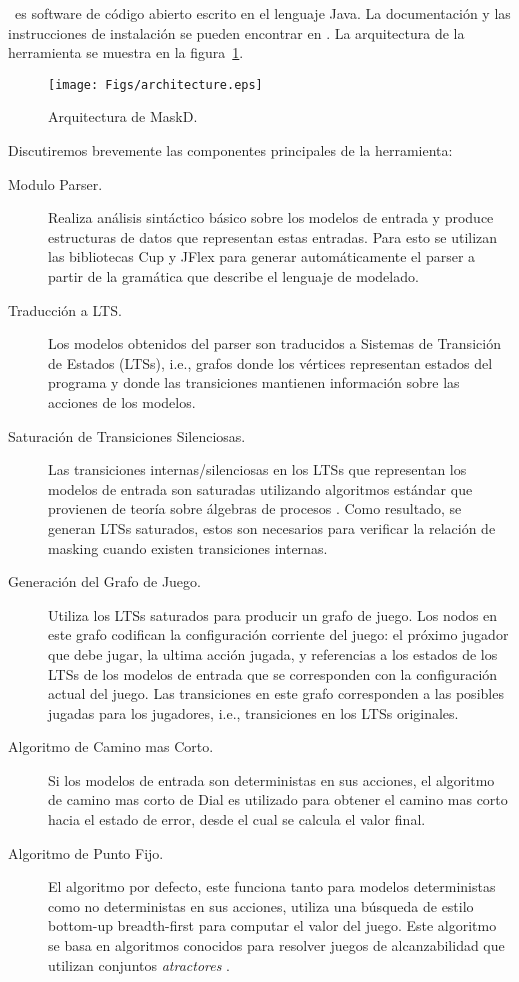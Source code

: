 \MaskD~es software de código abierto escrito en el lenguaje \textsf{Java}. La documentación y las instrucciones de instalación se pueden encontrar en \cite{MaskD}. La arquitectura de la herramienta se muestra en la figura~\ref{fig:arch}.
\begin{figure}[t]
    \centering
    \texttt{[image: Figs/architecture.eps]}
    \caption{Arquitectura de \textsf{MaskD}.}\label{fig:arch}
\end{figure}
    Discutiremos brevemente las componentes principales de la herramienta:
\begin{description}
    \item[Modulo Parser.] Realiza análisis sintáctico básico sobre los modelos de entrada y produce estructuras de datos que representan estas entradas. Para esto se utilizan las bibliotecas \textsf{Cup} y 
    \textsf{JFlex} para generar automáticamente el parser a partir de la gramática que describe el lenguaje de modelado.
    \item[Traducción a LTS.] Los modelos obtenidos del parser son traducidos a Sistemas de Transición de Estados (LTSs), i.e., 
    grafos donde los vértices representan estados del programa y donde las transiciones mantienen información sobre las acciones de los modelos. 
    \item[Saturación de Transiciones Silenciosas.] Las transiciones internas/silenciosas en los LTSs que representan los modelos de entrada son saturadas utilizando algoritmos estándar que provienen de teoría sobre álgebras de procesos \cite{Milner89}. Como resultado, se generan LTSs saturados, estos son necesarios para verificar la relación de masking cuando existen transiciones internas.
    \item[Generación del Grafo de Juego.] Utiliza los LTSs saturados para producir un grafo de juego. Los nodos en este grafo codifican la configuración corriente del juego: 
    el próximo jugador que debe jugar, la ultima acción jugada, y referencias a los estados de los LTSs de los modelos de entrada que se corresponden con la configuración actual del juego. 
    Las transiciones en este grafo corresponden a las posibles jugadas para los jugadores, i.e.,  transiciones en los LTSs originales.
    \item[Algoritmo de Camino mas Corto.] Si los modelos de entrada son deterministas en sus acciones, el algoritmo de camino mas corto de Dial es utilizado para obtener el camino mas corto hacia el estado de error, desde el cual se calcula el valor final.
    \item[Algoritmo de Punto Fijo.] El algoritmo por defecto, este funciona tanto para modelos deterministas como no deterministas en sus acciones, utiliza una búsqueda de estilo bottom-up breadth-first para computar el valor del juego. 
    Este algoritmo se basa en algoritmos conocidos para resolver juegos de alcanzabilidad que utilizan conjuntos \emph{atractores} \cite{Jurd11}. 
\end{description}
